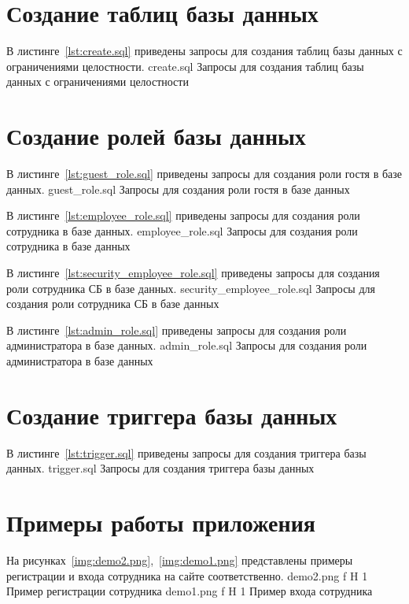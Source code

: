 \section{Создание таблиц базы данных}

В листинге~\ref{lst:create.sql} приведены запросы для создания таблиц базы данных с ограничениями целостности.
	{create.sql}
	{Запросы для создания таблиц базы данных с ограничениями целостности}

\section{Создание ролей базы данных}

В листинге~\ref{lst:guest_role.sql} приведены запросы для создания роли гостя в базе данных.
	{guest_role.sql}
	{Запросы для создания роли гостя в базе данных}

В листинге~\ref{lst:employee_role.sql} приведены запросы для создания роли сотрудника в базе данных.
	{employee_role.sql}
	{Запросы для создания роли сотрудника в базе данных}
	
В листинге~\ref{lst:security_employee_role.sql} приведены запросы для создания роли сотрудника СБ в базе данных.
	{security_employee_role.sql}
	{Запросы для создания роли сотрудника СБ в базе данных}
	
В листинге~\ref{lst:admin_role.sql} приведены запросы для создания роли администратора в базе данных.
	{admin_role.sql}
	{Запросы для создания роли администратора в базе данных}

\section{Создание триггера базы данных}

В листинге~\ref{lst:trigger.sql} приведены запросы для создания триггера базы данных.
	{trigger.sql}
	{Запросы для создания триггера базы данных}

\section{Примеры работы приложения}

На рисунках~\ref{img:demo2.png},~\ref{img:demo1.png} представлены примеры регистрации и входа сотрудника на сайте соответственно.
	{demo2.png}
	{f}
	{H}
	{1\textwidth}
	{Пример регистрации сотрудника}
	{demo1.png}
	{f}
	{H}
	{1\textwidth}
	{Пример входа сотрудника}

